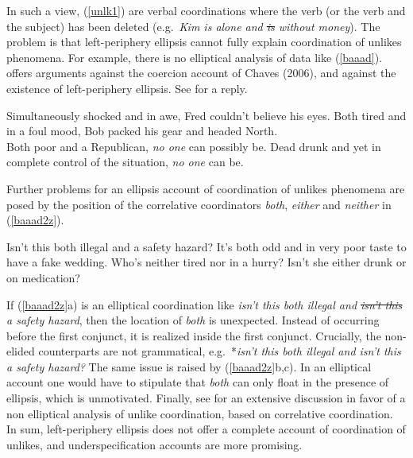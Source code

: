 \documentclass[output=paper]{langsci/langscibook}
\begin{document}
\noindent
In such a view, (\ref{unlk1})  are verbal coordinations where the verb (or the verb and the subject) has been deleted  (e.g.\ \emph{Kim is alone and \sout{is} without money}).  The problem is that  left-periphery ellipsis  cannot  fully explain 
coordination of unlikes phenomena. For example, there is no elliptical analysis of  data like (\ref{baaad}). \citet{levine11} offers  arguments against
the coercion account of Chaves (2006),
and against  the existence of left-periphery ellipsis. See \cite{yatabe12} for a reply.


\begin{exe}
\ex
\begin{xlista}
\ex Simultaneously shocked and in awe, Fred couldn't believe his eyes.
\ex  Both tired and in a foul mood, Bob packed his gear and headed North.\\
\citep{chaves06}
\ex Both poor and a Republican, \emph{no one} can possibly be.
\ex  Dead drunk and yet in complete control of the situation, \emph{no one} can be.\\
\citep{levine11}
\end{xlista}\label{baaad}
\end{exe}



\noindent
Further problems for an  ellipsis account of coordination
of unlikes phenomena are posed by the position of  the 
correlative coordinators \emph{both}, \emph{either} and
 \emph{neither} in (\ref{baaad2z}).

\begin{exe}
\ex
\begin{xlista}
\ex Isn't this both illegal and a safety hazard?
\ex It's both odd and in very poor taste to have a fake wedding.
\ex Who's neither tired nor in a hurry?
\ex Isn't she either drunk or on medication?
\end{xlista}\label{baaad2z}
\end{exe}



\noindent
 If (\ref{baaad2z}a) is an elliptical coordination
like \emph{isn't this both illegal and \sout{isn't this} a safety
hazard}, then the location of \emph{both} is unexpected. Instead of
occurring before the first conjunct, it is realized inside the first
conjunct. Crucially, the non-elided counterparts are not
grammatical, e.g.\ *\emph{isn't this both illegal and isn't this a
safety hazard?} The same issue is raised by (\ref{baaad2z}b,c). In
an elliptical account  one would have to stipulate
that \emph{both} can only float in the presence of ellipsis, which
is unmotivated.
Finally, see \citet{Mouret:07} for  an extensive discussion in favor of a non elliptical analysis of unlike coordination, based on correlative coordination.
In sum, left-periphery ellipsis does not 
offer a complete account of coordination of unlikes, and underspecification
accounts are more promising.
\end{document}
